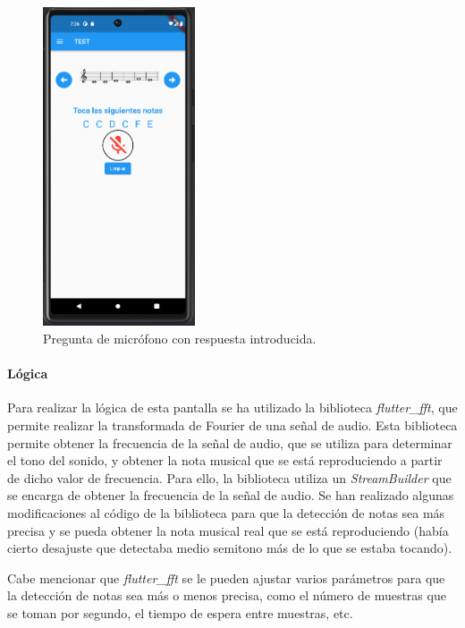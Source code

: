 \begin{figure}[H]
  \centering
  \includegraphics[width=0.4\textwidth]{imagenes/c7/entradamicrofono3.png}
  \caption{Pregunta de micrófono con respuesta introducida.}
  \label{fig:login}
\end{figure}

\paragraph*{Lógica}
Para realizar la lógica de esta pantalla se ha utilizado la biblioteca \textit{flutter\_fft}, que permite realizar la transformada de Fourier de una señal de audio.
Esta biblioteca permite obtener la frecuencia de la señal de audio, que se utiliza para determinar el tono del sonido,
 y obtener la nota musical que se está reproduciendo a partir de dicho valor de frecuencia.
Para ello, la biblioteca utiliza un \textit{StreamBuilder} que se encarga de obtener la frecuencia de la señal de audio. 
Se han realizado algunas modificaciones al código de la biblioteca para que la detección de notas sea más precisa y
 se pueda obtener la nota musical real que se está reproduciendo (había cierto desajuste que detectaba medio semitono más de lo que se estaba tocando).

Cabe mencionar que \textit{flutter\_fft} se le pueden ajustar varios parámetros para que la detección de notas sea más o menos precisa, 
como el número de muestras que se toman por segundo, el tiempo de espera entre muestras, etc.

